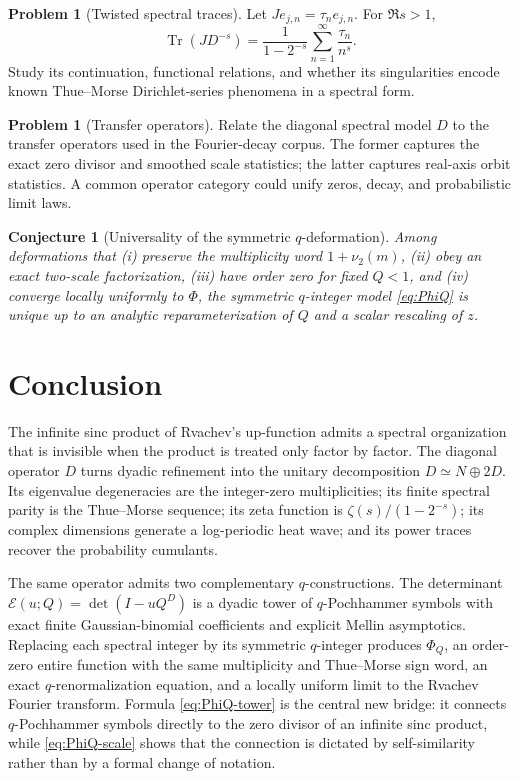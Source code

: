 \documentclass[11pt,oneside]{article}
\numberwithin{equation}{section}
\theoremstyle{plain}
\newtheorem{conjecture}[theorem]{Conjecture}
\theoremstyle{definition}
\newtheorem{problem}[theorem]{Problem}
\theoremstyle{remark}
\newcommand{\Tr}{\operatorname{Tr}}
\newcommand{\Ecal}{\mathscr E}
\newcommand{\tm}{\tau}
\begin{document}
\begin{problem}[Twisted spectral traces]
Let $J e_{j,n}=\tm_n e_{j,n}$.  For $\Re s>1$,
\begin{equation}\label{eq:twisted-zeta}
 \Tr(JD^{-s})
 =\frac{1}{1-2^{-s}}
 \sum_{n=1}^{\infty}\frac{\tm_n}{n^s}.
\end{equation}
Study its continuation, functional relations, and whether its singularities encode known Thue--Morse Dirichlet-series phenomena in a spectral form.
\end{problem}

\begin{problem}[Transfer operators]
Relate the diagonal spectral model $D$ to the transfer operators used in the Fourier-decay corpus.  The former captures the exact zero divisor and smoothed scale statistics; the latter captures real-axis orbit statistics.  A common operator category could unify zeros, decay, and probabilistic limit laws.
\end{problem}

\begin{conjecture}[Universality of the symmetric $q$-deformation]
Among deformations that (i) preserve the multiplicity word $1+\nu_2(m)$, (ii) obey an exact two-scale factorization, (iii) have order zero for fixed $Q<1$, and (iv) converge locally uniformly to $\Phi$, the symmetric $q$-integer model \cref{eq:PhiQ} is unique up to an analytic reparameterization of $Q$ and a scalar rescaling of $z$.
\end{conjecture}

\section{Conclusion}

The infinite sinc product of Rvachev's up-function admits a spectral organization that is invisible when the product is treated only factor by factor.  The diagonal operator $D$ turns dyadic refinement into the unitary decomposition $D\simeq N\oplus2D$.  Its eigenvalue degeneracies are the integer-zero multiplicities; its finite spectral parity is the Thue--Morse sequence; its zeta function is $\zeta(s)/(1-2^{-s})$; its complex dimensions generate a log-periodic heat wave; and its power traces recover the probability cumulants.

The same operator admits two complementary $q$-constructions.  The determinant $\Ecal(u;Q)=\det(I-uQ^D)$ is a dyadic tower of $q$-Pochhammer symbols with exact finite Gaussian-binomial coefficients and explicit Mellin asymptotics.  Replacing each spectral integer by its symmetric $q$-integer produces $\Phi_Q$, an order-zero entire function with the same multiplicity and Thue--Morse sign word, an exact $q$-renormalization equation, and a locally uniform limit to the Rvachev Fourier transform.  Formula \cref{eq:PhiQ-tower} is the central new bridge: it connects $q$-Pochhammer symbols directly to the zero divisor of an infinite sinc product, while \cref{eq:PhiQ-scale} shows that the connection is dictated by self-similarity rather than by a formal change of notation.
\end{document}
